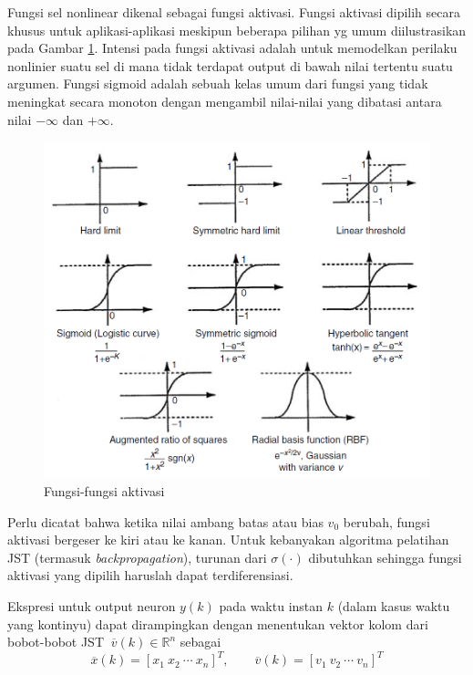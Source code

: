 Fungsi sel nonlinear dikenal sebagai fungsi aktivasi. Fungsi aktivasi dipilih secara khusus untuk aplikasi-aplikasi meskipun beberapa pilihan yg umum diilustrasikan pada Gambar \ref{fig:3:activation}. Intensi pada fungsi aktivasi adalah untuk memodelkan perilaku nonlinier suatu sel di mana tidak terdapat output di bawah nilai tertentu suatu argumen. Fungsi sigmoid adalah sebuah kelas umum dari fungsi yang tidak meningkat secara monoton dengan mengambil nilai-nilai yang dibatasi antara nilai $-\infty$ dan $+\infty$. 
\begin{figure}[!h]
	\centering
	\includegraphics[width=1\textwidth]{figures/activationFunction}
	\caption{Fungsi-fungsi aktivasi \cite{NNControlBook}}
	\label{fig:3:activation}
\end{figure}
Perlu dicatat bahwa ketika nilai ambang batas atau bias $v_0$ berubah, fungsi aktivasi bergeser ke kiri atau ke kanan. Untuk kebanyakan algoritma pelatihan JST (termasuk \textit{backpropagation}), turunan dari $\sigma(\cdot)$ dibutuhkan sehingga fungsi aktivasi yang dipilih haruslah dapat terdiferensiasi. \cite{NNControlBook}

Ekspresi untuk output neuron $y(k)$ pada waktu instan $k$ (dalam kasus waktu yang kontinyu) dapat dirampingkan dengan menentukan vektor kolom dari bobot-bobot JST $\ \overline{v}(k) \in \mathbb{R}^n $ sebagai
\vspace{-1em}
\begin{equation} \label{eq:3:vektorKolom}
\overline{x}(k) = [x_1\ x_2\ \cdots\ x_n]^T, \qquad \overline{v}(k) = [v_1\ v_2\ \cdots\ v_n]^T
\end{equation}

